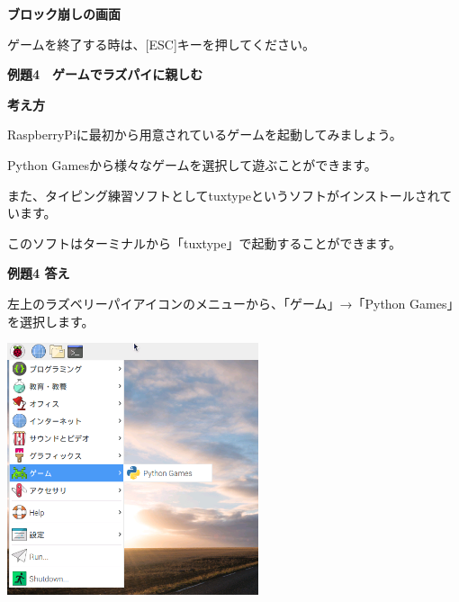 \documentclass[a4paper,dvipdfmx]{jarticle}
\newcommand\textstyleqwerty[1]{#1}
\begin{document}
\bigskip


\bigskip


\bigskip


\bigskip


\bigskip


\bigskip


\bigskip


\bigskip


\bigskip


\bigskip


\bigskip


\bigskip


\bigskip

\textstyleqwerty{\textbf{ブロック崩しの画面}}


\bigskip


\bigskip


\bigskip


\bigskip


\bigskip

ゲームを終了する時は、[ESC]キーを押してください。


\bigskip

\clearpage
\textstyleqwerty{\textbf{例題4　ゲームでラズパイに親しむ}}


\bigskip

{\bfseries
考え方}


\bigskip

RaspberryPiに最初から用意されているゲームを起動してみましょう。

Python
Gamesから様々なゲームを選択して遊ぶことができます。

また、タイピング練習ソフトとしてtuxtypeというソフトがインストールされています。

このソフトはターミナルから「tuxtype」で起動することができます。


\bigskip

{\bfseries
例題4 答え}


\bigskip

左上のラズベリーパイアイコンのメニューから、「ゲーム」→「Python
Games」を選択します。



\begin{center}
\includegraphics[width=7.382cm,height=7.414cm]{text02-img/text02-img017.png}

\end{center}
\end{document}
